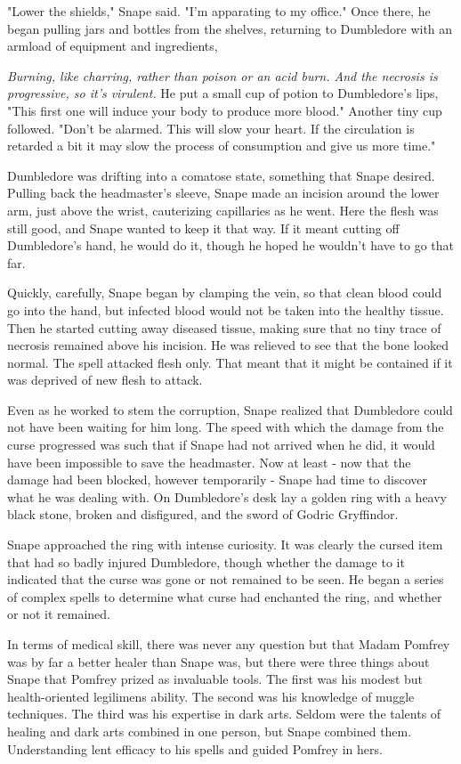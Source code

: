 \documentclass[a4paper,11pt]{article}
\begin{document}
"Lower the shields," Snape said. "I'm apparating to my office." Once there, he began pulling jars and bottles from the shelves, returning to Dumbledore with an armload of equipment and ingredients,

\emph{Burning, like charring, rather than poison or an acid burn. And the necrosis is progressive, so it's virulent.} He put a small cup of potion to Dumbledore's lips, "This first one will induce your body to produce more blood." Another tiny cup followed. "Don't be alarmed. This will slow your heart. If the circulation is retarded a bit it may slow the process of consumption and give us more time."

Dumbledore was drifting into a comatose state, something that Snape desired. Pulling back the headmaster's sleeve, Snape made an incision around the lower arm, just above the wrist, cauterizing capillaries as he went. Here the flesh was still good, and Snape wanted to keep it that way. If it meant cutting off Dumbledore's hand, he would do it, though he hoped he wouldn't have to go that far.

Quickly, carefully, Snape began by clamping the vein, so that clean blood could go into the hand, but infected blood would not be taken into the healthy tissue. Then he started cutting away diseased tissue, making sure that no tiny trace of necrosis remained above his incision. He was relieved to see that the bone looked normal. The spell attacked flesh only. That meant that it might be contained if it was deprived of new flesh to attack.

Even as he worked to stem the corruption, Snape realized that Dumbledore could not have been waiting for him long. The speed with which the damage from the curse progressed was such that if Snape had not arrived when he did, it would have been impossible to save the headmaster. Now at least - now that the damage had been blocked, however temporarily - Snape had time to discover what he was dealing with. On Dumbledore's desk lay a golden ring with a heavy black stone, broken and disfigured, and the sword of Godric Gryffindor.

Snape approached the ring with intense curiosity. It was clearly the cursed item that had so badly injured Dumbledore, though whether the damage to it indicated that the curse was gone or not remained to be seen. He began a series of complex spells to determine what curse had enchanted the ring, and whether or not it remained.

In terms of medical skill, there was never any question but that Madam Pomfrey was by far a better healer than Snape was, but there were three things about Snape that Pomfrey prized as invaluable tools. The first was his modest but health-oriented legilimens ability. The second was his knowledge of muggle techniques. The third was his expertise in dark arts. Seldom were the talents of healing and dark arts combined in one person, but Snape combined them. Understanding lent efficacy to his spells and guided Pomfrey in hers.
\end{document}
